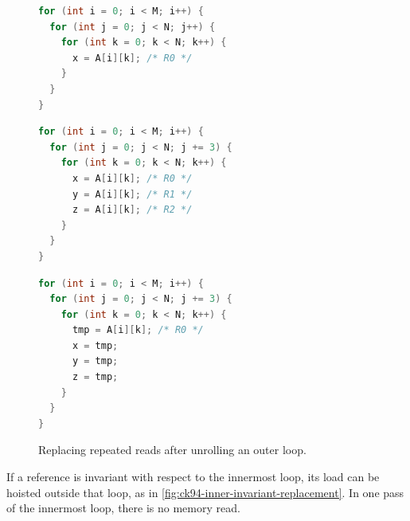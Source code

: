 \begin{figure}[H]
  \centering
  \begin{minipage}[t]{\textwidth}
\begin{lstlisting}[language=C, caption={Original Loop}]
for (int i = 0; i < M; i++) {
  for (int j = 0; j < N; j++) {
    for (int k = 0; k < N; k++) {
      x = A[i][k]; /* R0 */
    }
  }
}
\end{lstlisting}
  \end{minipage}
  \par\medskip
  \begin{minipage}[t]{0.48\textwidth}
\begin{lstlisting}[language=C, caption={After Unroll-and-Jam}]
for (int i = 0; i < M; i++) {
  for (int j = 0; j < N; j += 3) {
    for (int k = 0; k < N; k++) {
      x = A[i][k]; /* R0 */
      y = A[i][k]; /* R1 */
      z = A[i][k]; /* R2 */
    }
  }
}
\end{lstlisting}
  \end{minipage}%
  \hfill
  \begin{minipage}[t]{0.48\textwidth}
\begin{lstlisting}[language=C,
  caption={Outer-loop invariant read after scalar replacement},
  label={lst:ck94-outer-invariant-replaced}]
for (int i = 0; i < M; i++) {
  for (int j = 0; j < N; j += 3) {
    for (int k = 0; k < N; k++) {
      tmp = A[i][k]; /* R0 */
      x = tmp;
      y = tmp;
      z = tmp;
    }
  }
}
\end{lstlisting}
  \end{minipage}
  \caption{Replacing repeated reads after unrolling an outer loop.}
  \label{fig:ck94-outer-invariant-replacement}
\end{figure}

If a reference is invariant with respect to the innermost loop, its load
can be hoisted outside that loop, as in
\cref{fig:ck94-inner-invariant-replacement}. In one pass of the innermost loop,
there is no memory read.

